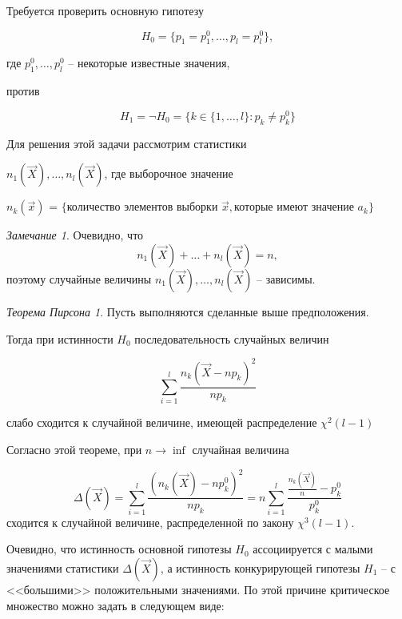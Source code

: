 \documentclass[a4paper, 12pt]{article}
\theoremstyle{definition}
\theoremstyle{leads}
\theoremstyle{example}
\theoremstyle{remark}
\newtheorem{remark}{Замечание}
\begin{document}
Требуется проверить основную гипотезу

\begin{equation*}
	H_0 = \{p_1 = p_1^0, \dots, p_l = p_l^0\}, 
\end{equation*}

где $p_1^0, \dots, p_l^0$ -- некоторые известные значения,

против

\begin{equation*}
	H_1 = \neg H_0 = \{k \in \{1, \dots, l\} : p_k \neq p_k^0\} 
\end{equation*}

Для решения этой задачи рассмотрим статистики

$n_1(\vec{X}), \dots, n_l(\vec{X})$, где выборочное значение 

$n_k(\vec{x})$ = $\{\text{количество элементов выборки  } \vec{x}, \text{которые имеют значение  } a_k \}$

\begin{remark}
	Очевидно, что 
	\begin{equation*}
		n_1(\vec{X}) + \dots + n_l(\vec{X}) = n,
	\end{equation*}
	поэтому случайные величины $n_1(\vec{X}), \dots, n_l(\vec{X})$ -- зависимы.
\end{remark}

\newtheorem*{Piersonn}{Теорема Пирсона}
\begin{Piersonn}
Пусть выполняются сделанные выше предположения.

Тогда при истинности $H_0$ последовательность случайных величин

\begin{center}
	\centering
	$$\sum_{i=1}^{l} \frac{n_k(\vec{X} - np_k)^2}{n p_k}$$
\end{center}

слабо сходится к случайной величине, имеющей распределение $\chi^2(l - 1)$
\end{Piersonn}

Согласно этой теореме, при $n \longrightarrow \inf$ случайная величина

\begin{equation*}
	\Delta(\vec{X}) = \sum_{i=1}^{l} \frac{(n_k(\vec{X}) - n p_k^0)^2}{n p_k} = n \sum_{i=1}^{l} \frac{\frac{n_k(\vec{X})}{n} - p_k^0}{p_k^0}
\end{equation*}
сходится к случайной величине, распределенной по закону $\chi^3(l - 1)$.

Очевидно, что истинность основной гипотезы $H_0$ ассоциируется с малыми значениями статистики $\Delta(\vec{X})$, а истинность конкурирующей гипотезы $H_1$ -- с <<большими>> положительными значениями. По этой причине критическое множество можно задать в следующем виде:
\end{document}
